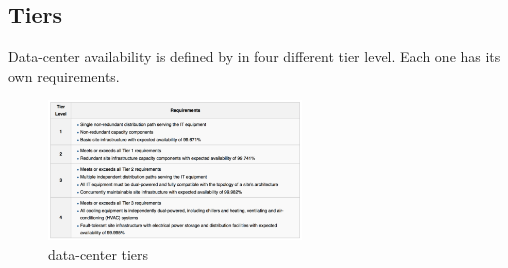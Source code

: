 \documentclass[10pt, oneside]{article}
\begin{document}
\subsection{Tiers}
Data-center availability is defined by in four different tier level. Each one has its own requirements.
\begin{figure}[H]
    \begin{center}
    \includegraphics[width=0.6\textwidth]{img/img30.png}
    \caption{data-center tiers}
    \label{fig:tiers}
    \end{center}
\end{figure}

\newpage
\end{document}
